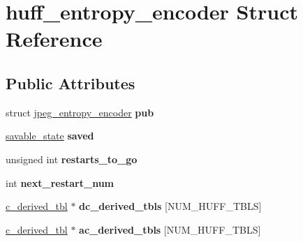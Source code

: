 \hypertarget{structhuff__entropy__encoder}{}\section{huff\+\_\+entropy\+\_\+encoder Struct Reference}
\label{structhuff__entropy__encoder}
\subsection*{Public Attributes}
\begin{DoxyCompactItemize}
\item 
struct \hyperlink{structjpeg__entropy__encoder}{jpeg\+\_\+entropy\+\_\+encoder} {\bfseries pub}\hypertarget{structhuff__entropy__encoder_a1a7606509ffbd9efd4c611af433879e0}{}\label{structhuff__entropy__encoder_a1a7606509ffbd9efd4c611af433879e0}

\item 
\hyperlink{structsavable__state}{savable\+\_\+state} {\bfseries saved}\hypertarget{structhuff__entropy__encoder_ac27e136d5c3baca34bafde2053d91ad0}{}\label{structhuff__entropy__encoder_ac27e136d5c3baca34bafde2053d91ad0}

\item 
unsigned int {\bfseries restarts\+\_\+to\+\_\+go}\hypertarget{structhuff__entropy__encoder_a6c999079a14022f2610081d420c36513}{}\label{structhuff__entropy__encoder_a6c999079a14022f2610081d420c36513}

\item 
int {\bfseries next\+\_\+restart\+\_\+num}\hypertarget{structhuff__entropy__encoder_ad6a426b0d41e9d06359bcc57481c891b}{}\label{structhuff__entropy__encoder_ad6a426b0d41e9d06359bcc57481c891b}

\item 
\hyperlink{structc__derived__tbl}{c\+\_\+derived\+\_\+tbl} $\ast$ {\bfseries dc\+\_\+derived\+\_\+tbls} \mbox{[}N\+U\+M\+\_\+\+H\+U\+F\+F\+\_\+\+T\+B\+LS\mbox{]}\hypertarget{structhuff__entropy__encoder_a6264cf74944972824cea6639229bdebe}{}\label{structhuff__entropy__encoder_a6264cf74944972824cea6639229bdebe}

\item 
\hyperlink{structc__derived__tbl}{c\+\_\+derived\+\_\+tbl} $\ast$ {\bfseries ac\+\_\+derived\+\_\+tbls} \mbox{[}N\+U\+M\+\_\+\+H\+U\+F\+F\+\_\+\+T\+B\+LS\mbox{]}\hypertarget{structhuff__entropy__encoder_a0b67beb3a73da24b5d09693f3c0c8b22}{}\label{structhuff__entropy__encoder_a0b67beb3a73da24b5d09693f3c0c8b22}


\end{DoxyCompactItemize}

